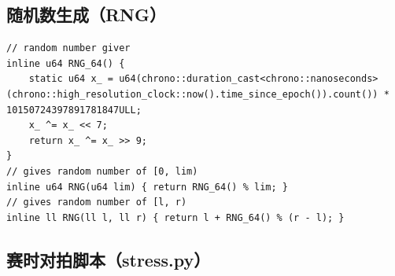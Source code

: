\subsection{随机数生成（RNG）}

\begin{lstlisting}
// random number giver
inline u64 RNG_64() {
    static u64 x_ = u64(chrono::duration_cast<chrono::nanoseconds>(chrono::high_resolution_clock::now().time_since_epoch()).count()) * 10150724397891781847ULL;
    x_ ^= x_ << 7;
    return x_ ^= x_ >> 9;
}
// gives random number of [0, lim)
inline u64 RNG(u64 lim) { return RNG_64() % lim; }
// gives random number of [l, r)
inline ll RNG(ll l, ll r) { return l + RNG_64() % (r - l); }
\end{lstlisting}

\subsection{赛时对拍脚本（stress.py）}

